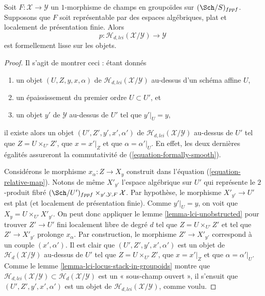 \begin{lemma}
\label{lemma-lci-formally-smooth}
Soit $F : \mathcal{X} \to \mathcal{Y}$ un $1$-morphisme de champs en groupoïdes
sur $(\Sch/S)_{fppf}$. Supposons que $F$ soit représentable par des espaces
algébriques, plat et localement de présentation finie. Alors
$$
p : \mathcal{H}_{d, lci}(\mathcal{X}/\mathcal{Y}) \to \mathcal{Y}
$$
est formellement lisse sur les objets.
\end{lemma}

\begin{proof}
Il s'agit de montrer ceci : étant donnés
\begin{enumerate}
\item un objet $(U, Z, y, x, \alpha)$ de
$\mathcal{H}_{d, lci}(\mathcal{X}/\mathcal{Y})$ au-dessus d'un schéma affine $U$,
\item un épaississement du premier ordre $U \subset U'$, et
\item un objet $y'$ de $\mathcal{Y}$ au-dessus de $U'$ tel que $y'|_U = y$,
\end{enumerate}
il existe alors un objet $(U', Z', y', x', \alpha')$ de
$\mathcal{H}_{d, lci}(\mathcal{X}/\mathcal{Y})$ au-dessus de $U'$ tel que
$Z = U \times_{U'} Z'$, que $x = x'|_Z$ et que
$\alpha = \alpha'|_U$. En effet, les deux dernières égalités assureront
la commutativité de (\ref{equation-formally-smooth}).

\medskip\noindent
Considérons le morphisme $x_\alpha : Z \to X_y$ construit dans
l'équation (\ref{equation-relative-map}). Notons de même $X'_{y'}$
l'espace algébrique sur $U'$ qui représente le $2$-produit fibré
$(\Sch/U')_{fppf} \times_{y', \mathcal{Y}, F} \mathcal{X}$.
Par hypothèse, le morphisme $X'_{y'} \to U'$ est plat (et localement de
présentation finie). Comme $y'|_U = y$, on voit que $X_y = U \times_{U'} X'_{y'}$.
On peut donc appliquer le
lemme \ref{lemma-lci-unobstructed}
pour trouver $Z' \to U'$ fini localement libre de degré $d$ tel que
$Z = U \times_{U'} Z'$ et tel que $Z' \to X'_{y'}$ prolonge $x_\alpha$.
Par construction, le morphisme $Z' \to X'_{y'}$ correspond à un couple
$(x', \alpha')$. Il est clair que $(U', Z', y', x', \alpha')$
est un objet de $\mathcal{H}_d(\mathcal{X}/\mathcal{Y})$ au-dessus de $U'$
tel que $Z = U \times_{U'} Z'$, que $x = x'|_Z$ et que
$\alpha = \alpha'|_U$. Comme le
lemme \ref{lemma-lci-locus-stack-in-groupoids}
montre que $\mathcal{H}_{d, lci}(\mathcal{X}/\mathcal{Y}) \subset
\mathcal{H}_d(\mathcal{X}/\mathcal{Y})$ est un « sous-champ ouvert »,
il s'ensuit que $(U', Z', y', x', \alpha')$ est un objet de
$\mathcal{H}_{d, lci}(\mathcal{X}/\mathcal{Y})$, comme voulu.
\end{proof}

